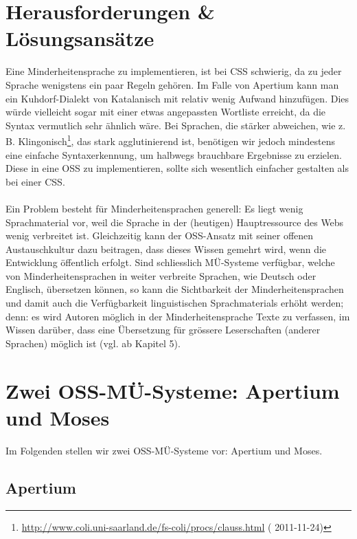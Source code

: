 \documentclass[11pt,twoside]{mparticle}
\newcommand{\urld}[2][???]{\url{#2} (\iflanguage{ngerman}{letzter
    Zugriff:}{accessed} #1)}
\begin{document}
\section{Herausforderungen \& Lösungsansätze}
\label{herausforderungen}
Eine Minderheitensprache zu implementieren, ist bei CSS schwierig, da
zu jeder Sprache wenigstens ein paar Regeln gehören. Im Falle von
Apertium kann man ein Kuhdorf-Dialekt von Katalanisch mit relativ
wenig Aufwand hinzufügen. Dies würde vielleicht sogar mit einer etwas
angepassten Wortliste erreicht, da die Syntax vermutlich sehr
ähnlich wäre. Bei Sprachen, die stärker abweichen, wie z. B. Klingonisch\footnote{\urld[2011-11-24]{http://www.coli.uni-saarland.de/fs-coli/procs/clauss.html}},
das stark agglutinierend ist, benötigen wir jedoch mindestens eine einfache 
Syntaxerkennung, um halbwegs brauchbare Ergebnisse zu erzielen. Diese in eine OSS zu
implementieren, sollte sich wesentlich einfacher gestalten als bei
einer CSS.
\\
\\
Ein Problem besteht für Minderheitensprachen generell: Es liegt wenig Sprachmaterial vor, weil die Sprache
in der (heutigen) Hauptressource des Webs wenig verbreitet ist. Gleichzeitig kann der OSS-Ansatz mit seiner
offenen Austauschkultur dazu beitragen, dass dieses Wissen gemehrt wird, wenn die Entwicklung öffentlich
erfolgt. Sind schliesslich MÜ-Systeme verfügbar, welche von Minderheitensprachen in weiter verbreite
Sprachen, wie Deutsch oder Englisch, übersetzen können, so kann die Sichtbarkeit der Minderheitensprachen
und damit auch die Verfügbarkeit linguistischen Sprachmaterials erhöht werden; denn: es wird Autoren möglich in der
Minderheitensprache Texte zu verfassen, im Wissen darüber, dass eine Übersetzung für grössere Leserschaften
(anderer Sprachen) möglich ist (vgl. \cite{forcada} ab Kapitel 5).

\section{Zwei OSS-MÜ-Systeme: Apertium und Moses}
\label{apertiumMoses}
Im Folgenden stellen wir zwei OSS-MÜ-Systeme vor: Apertium und Moses.

\subsection{Apertium}
\label{apertium}
\end{document}
